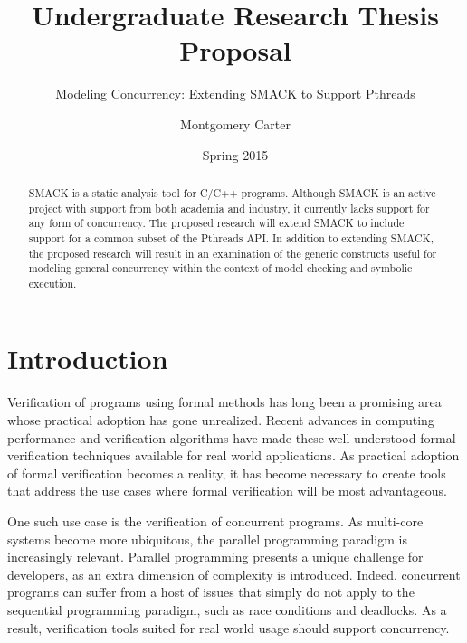 \documentclass{scrartcl}
\title{Undergraduate Research Thesis Proposal}
\subtitle{Modeling Concurrency: Extending SMACK to Support Pthreads}
\author{Montgomery Carter}
\date{Spring 2015}
\begin{document}

\maketitle

\begin{abstract}
SMACK is a static analysis tool for C/C++ programs.  Although SMACK is an active project with support from both academia and industry, it currently lacks support for any form of concurrency.  The proposed research will extend SMACK to include support for a common subset of the Pthreads API.  In addition to extending SMACK, the proposed research will result in an examination of the generic constructs useful for modeling general concurrency within the context of model checking and symbolic execution.
\end{abstract}

\newpage


\section{Introduction}

Verification of programs using formal methods has long been a promising area whose practical adoption has gone unrealized.  Recent advances in computing performance and verification algorithms have made these well-understood formal verification techniques available for real world applications.  As practical adoption of formal verification becomes a reality, it has become necessary to create tools that address the use cases where formal verification will be most advantageous.

One such use case is the verification of concurrent programs.  As multi-core systems become more ubiquitous, the parallel programming paradigm is increasingly relevant.  Parallel programming presents a unique challenge for developers, as an extra dimension of complexity is introduced.  Indeed, concurrent programs can suffer from a host of issues that simply do not apply to the sequential programming paradigm, such as race conditions and deadlocks.  As a result, verification tools suited for real world usage should support concurrency.
\end{document}
